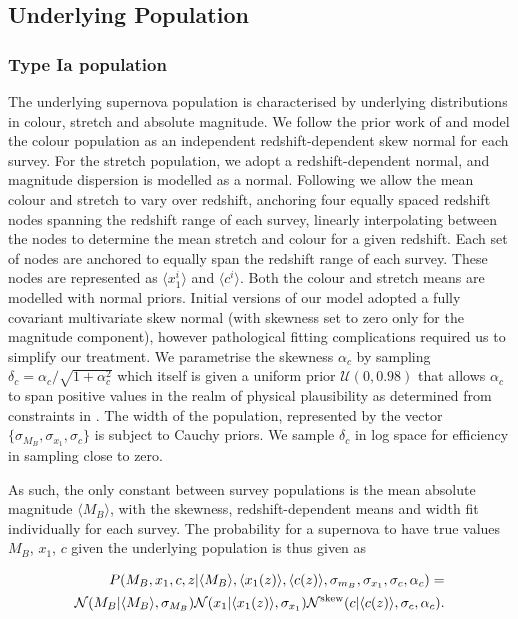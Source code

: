 \documentclass[a4paper,fleqn,usenatbib]{mnras}
\newcommand{\green}{\color{forestgreen}}
\newcommand{\rubin}{\citetalias{Rubin2015}}
\begin{document}
\subsection{Underlying Population}

\subsubsection{Type Ia population} 
\label{sec:underlying}
The underlying supernova population is characterised by underlying distributions in colour, stretch and absolute magnitude. We follow the prior work of {\rubin} and model the colour population as an independent redshift-dependent skew normal for each survey. For the stretch population, we adopt a redshift-dependent normal, and magnitude dispersion is modelled as a normal. Following {\rubin} we allow the mean colour and stretch to vary over redshift, anchoring four equally spaced redshift nodes spanning the redshift range of each survey, linearly interpolating between the nodes to determine the mean stretch and colour for a given redshift. Each set of nodes are anchored to equally span the {\green redshift range }of each survey. These nodes are represented as $\langle x_1^i \rangle$ and $\langle c^i \rangle$. Both the colour and stretch means are modelled with normal priors. Initial versions of our model adopted a fully covariant multivariate skew normal (with skewness set to zero only for the magnitude component), however pathological fitting complications required us to simplify our treatment. We parametrise the skewness $\alpha_c$ by sampling $\delta_c = \alpha_c / \sqrt{1 + \alpha_c^2}$ which itself is given a uniform prior $\mathcal{U}(0,0.98)$ {\green that} allows $\alpha_c$ to span positive values in the realm of physical plausibility as determined from constraints in \citet{Scolnic2016}. The width of the population, represented by the vector $\lbrace \sigma_{M_B}, \sigma_{x_1}, \sigma_c \rbrace$ is subject to Cauchy priors. We sample $\delta_c$ in log space for efficiency in sampling close to zero. 

As such, the only constant between survey populations is the mean absolute magnitude $\langle M_B \rangle$, with the skewness, redshift-dependent means and width fit individually for each survey. The probability for a supernova to have true values $M_B$, $x_1$, $c$ given the underlying population is thus given as

\begin{align}
P(M_B, x_1, c, z | \langle M_B \rangle, \langle x_1(z) \rangle, \langle c(z) \rangle, \sigma_{m_B}, \sigma_{x_1}, \sigma_c, \alpha_c) = \notag \\
\mathcal{N}(M_B|\langle M_B \rangle, \sigma_{M_B}) \mathcal{N}(x_1 | \langle x_1(z) \rangle, \sigma_{x_1}) \mathcal{N}^{\rm{skew}}(c| \langle c(z) \rangle, \sigma_c, \alpha_c) \label{eq:l1}.
\end{align}
\end{document}
